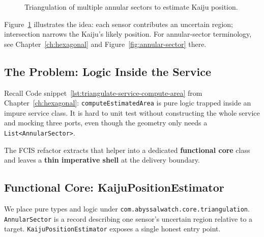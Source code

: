 \begin{figure}[htbp]
    \centering
    \caption{Triangulation of multiple annular sectors to estimate Kaiju position.}
    \label{fig:fcis_annular_triangulation}
\end{figure}


Figure~\ref{fig:fcis_annular_triangulation} illustrates the idea: each sensor contributes an uncertain region; intersection narrows the Kaiju's likely position. For annular-sector terminology, see Chapter~\ref{ch:hexagonal} and Figure~\ref{fig:annular-sector} there.

\subsection{The Problem: Logic Inside the Service}
\label{sec:fcis_triangulation_problem}

Recall Code snippet~\ref{lst:triangulate-service-compute-area} from Chapter~\ref{ch:hexagonal}: \texttt{computeEstimatedArea} is pure logic trapped inside an impure service class. It is hard to unit test without constructing the whole service and mocking three ports, even though the geometry only needs a \texttt{List<AnnularSector>}.

The FCIS refactor extracts that helper into a dedicated \textbf{functional core} class and leaves a \textbf{thin imperative shell} at the delivery boundary.

\subsection{Functional Core: KaijuPositionEstimator}
\label{sec:fcis_triangulation_core}

We place pure types and logic under \texttt{com.abyssalwatch.core.triangulation}. \texttt{AnnularSector} is a record describing one sensor's uncertain region relative to a target. \texttt{KaijuPositionEstimator} exposes a single honest entry point.

